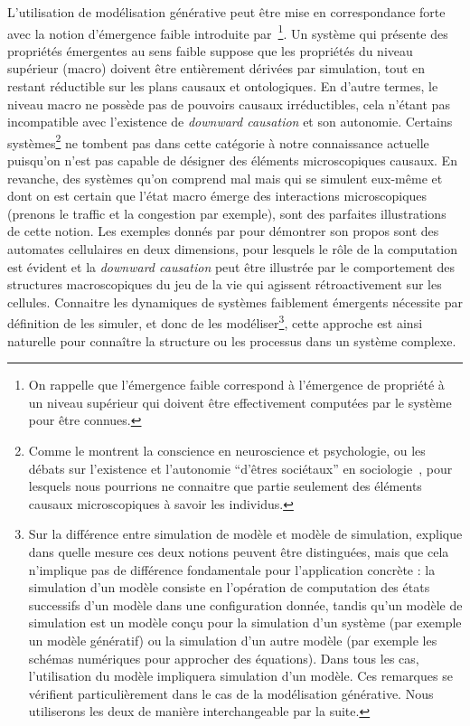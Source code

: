L'utilisation de modélisation générative peut être mise en correspondance forte avec la notion d'émergence faible introduite par~\cite{bedau2002downward}\footnote{On rappelle que l'émergence faible correspond à l'émergence de propriété à un niveau supérieur qui doivent être effectivement computées par le système pour être connues.}. Un système qui présente des propriétés émergentes au sens faible suppose que les propriétés du niveau supérieur (macro) doivent être entièrement dérivées par simulation, tout en restant réductible sur les plans causaux et ontologiques. En d'autre termes, le niveau macro ne possède pas de pouvoirs causaux irréductibles, cela n'étant pas incompatible avec l'existence de \emph{downward causation} et son autonomie. Certains systèmes\footnote{Comme le montrent la conscience en neuroscience et psychologie, ou les débats sur l'existence et l'autonomie ``d'êtres sociétaux'' en sociologie~\cite{angeletti2015etres}, pour lesquels nous pourrions ne connaitre que partie seulement des éléments causaux microscopiques à savoir les individus.} ne tombent pas dans cette catégorie à notre connaissance actuelle puisqu'on n'est pas capable de désigner des éléments microscopiques causaux. En revanche, des systèmes qu'on comprend mal mais qui se simulent eux-même et dont on est certain que l'état macro émerge des interactions microscopiques (prenons le traffic et la congestion par exemple), sont des parfaites illustrations de cette notion. Les exemples donnés par  pour démontrer son propos sont des automates cellulaires en deux dimensions, pour lesquels le rôle de la computation est évident et la \emph{downward causation} peut être illustrée par le comportement des structures macroscopiques du jeu de la vie qui agissent rétroactivement sur les cellules. Connaitre les dynamiques de systèmes faiblement émergents nécessite par définition de les simuler, et donc de les modéliser\footnote{Sur la différence entre simulation de modèle et modèle de simulation, \cite{phan2010agent} explique dans quelle mesure ces deux notions peuvent être distinguées, mais que cela n'implique pas de différence fondamentale pour l'application concrète : la simulation d'un modèle consiste en l'opération de computation des états successifs d'un modèle dans une configuration donnée, tandis qu'un modèle de simulation est un modèle conçu pour la simulation d'un système (par exemple un modèle génératif) ou la simulation d'un autre modèle (par exemple les schémas numériques pour approcher des équations). Dans tous les cas, l'utilisation du modèle impliquera simulation d'un modèle. Ces remarques se vérifient particulièrement dans le cas de la modélisation générative. Nous utiliserons les deux de manière interchangeable par la suite.}, cette approche est ainsi naturelle pour connaître la structure ou les processus dans un système complexe.



